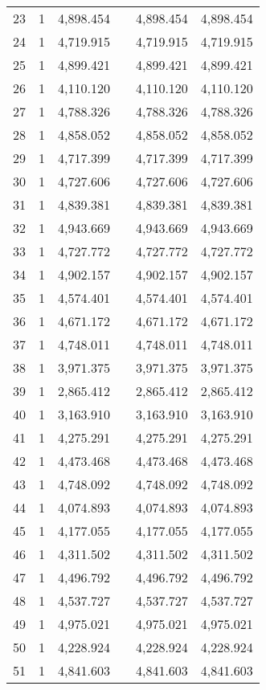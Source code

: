 \begin{table}[!htbp]
\begin{tabular}{@{\extracolsep{5pt}}lccccc}
23 & 1 & 4,898.454 &  & 4,898.454 & 4,898.454 \\ 
24 & 1 & 4,719.915 &  & 4,719.915 & 4,719.915 \\ 
25 & 1 & 4,899.421 &  & 4,899.421 & 4,899.421 \\ 
26 & 1 & 4,110.120 &  & 4,110.120 & 4,110.120 \\ 
27 & 1 & 4,788.326 &  & 4,788.326 & 4,788.326 \\ 
28 & 1 & 4,858.052 &  & 4,858.052 & 4,858.052 \\ 
29 & 1 & 4,717.399 &  & 4,717.399 & 4,717.399 \\ 
30 & 1 & 4,727.606 &  & 4,727.606 & 4,727.606 \\ 
31 & 1 & 4,839.381 &  & 4,839.381 & 4,839.381 \\ 
32 & 1 & 4,943.669 &  & 4,943.669 & 4,943.669 \\ 
33 & 1 & 4,727.772 &  & 4,727.772 & 4,727.772 \\ 
34 & 1 & 4,902.157 &  & 4,902.157 & 4,902.157 \\ 
35 & 1 & 4,574.401 &  & 4,574.401 & 4,574.401 \\ 
36 & 1 & 4,671.172 &  & 4,671.172 & 4,671.172 \\ 
37 & 1 & 4,748.011 &  & 4,748.011 & 4,748.011 \\ 
38 & 1 & 3,971.375 &  & 3,971.375 & 3,971.375 \\ 
39 & 1 & 2,865.412 &  & 2,865.412 & 2,865.412 \\ 
40 & 1 & 3,163.910 &  & 3,163.910 & 3,163.910 \\ 
41 & 1 & 4,275.291 &  & 4,275.291 & 4,275.291 \\ 
42 & 1 & 4,473.468 &  & 4,473.468 & 4,473.468 \\ 
43 & 1 & 4,748.092 &  & 4,748.092 & 4,748.092 \\ 
44 & 1 & 4,074.893 &  & 4,074.893 & 4,074.893 \\ 
45 & 1 & 4,177.055 &  & 4,177.055 & 4,177.055 \\ 
46 & 1 & 4,311.502 &  & 4,311.502 & 4,311.502 \\ 
47 & 1 & 4,496.792 &  & 4,496.792 & 4,496.792 \\ 
48 & 1 & 4,537.727 &  & 4,537.727 & 4,537.727 \\ 
49 & 1 & 4,975.021 &  & 4,975.021 & 4,975.021 \\ 
50 & 1 & 4,228.924 &  & 4,228.924 & 4,228.924 \\ 
51 & 1 & 4,841.603 &  & 4,841.603 & 4,841.603 \\ 

\end{tabular}
\end{table}
